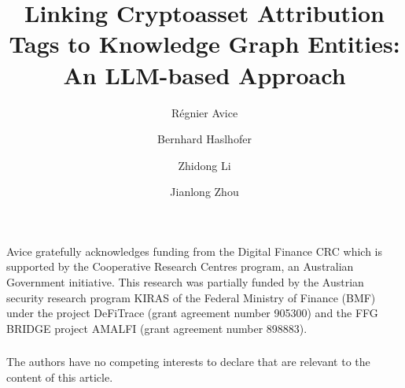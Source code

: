 \documentclass[runningheads]{llncs}
\begin{document}
%
\title{\texorpdfstring{Linking Cryptoasset Attribution Tags to Knowledge Graph Entities: \\ An LLM-based Approach}{Linking Cryptoasset Attribution Tags to Knowledge Graph Entities: An LLM-based Approach}}
%
%
\author{Régnier Avice \and
Bernhard Haslhofer \and
Zhidong Li \and
Jianlong Zhou}
%
%
%

%
\maketitle
%
\begin{abstract}

\end{abstract}








\begin{credits}
\subsubsection{\ackname} Avice gratefully acknowledges funding from the Digital Finance CRC which is supported by the Cooperative Research Centres program, an Australian Government initiative. This research was partially funded by the Austrian security research program KIRAS of the Federal Ministry of Finance (BMF) under the project DeFiTrace (grant agreement number 905300) and the FFG BRIDGE project AMALFI (grant agreement number 898883).

\subsubsection{\discintname}
The authors have no competing interests to declare that are relevant to the content of this article.
\end{credits}





\end{document}
